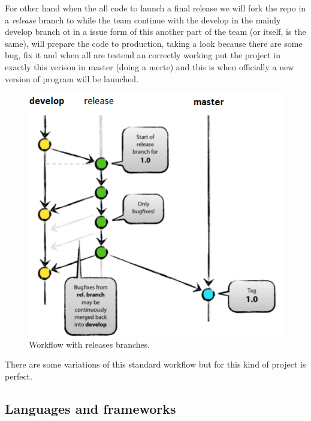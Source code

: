 \noindent For other hand when the all code to launch a final release we will fork the
repo in a \textit{release} branch to while the team continue with the develop
in the mainly develop branch ot in a issue form of this another part of the
team (or itself, is the same), will prepare the code to production, taking a look
because there are some bug, fix it and when all are testend an correctly working
put the project in exactly this verison in master (doing a merte) and this is
when officially a new version of program will be launched.

\begin{figure}[H]
  \includegraphics[scale=0.5]{img/git/release_branches.png}
  \centering
  \caption{Workflow with releases branches.}
\end{figure}

\noindent There are some variations of this standard workflow but for this kind of project
is perfect.

\subsection{Languages and frameworks}

